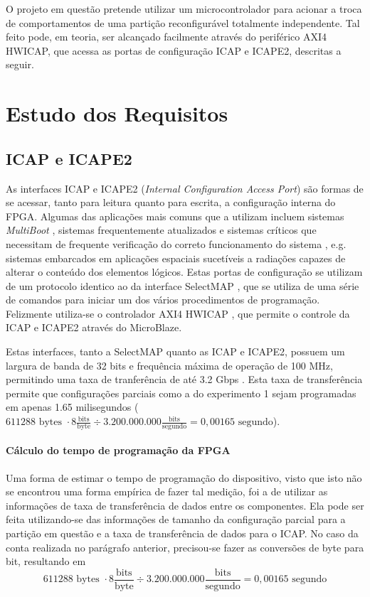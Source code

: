 \documentclass[11pt,a4paper,oneside]{book}
\begin{document}
O projeto em questão pretende utilizar um microcontrolador para acionar a troca de comportamentos de uma partição reconfigurável totalmente independente.
Tal feito pode, em teoria, ser alcançado facilmente através do periférico AXI4 HWICAP, que acessa as portas de configuração ICAP e ICAPE2, descritas a seguir.

\section{Estudo dos Requisitos}
\subsection{ICAP e ICAPE2}
As interfaces ICAP e ICAPE2 (\textit{Internal Configuration Access Port}) são formas de se acessar, tanto para leitura quanto para escrita, a configuração interna do FPGA.
Algumas das aplicações mais comuns que a utilizam incluem sistemas \textit{MultiBoot} \cite{xapp468, xapp1100}, sistemas frequentemente atualizados e sistemas críticos que necessitam de frequente verificação do correto funcionamento do sistema \cite{xapp468, xapp887}, e.g. sistemas embarcados em aplicações espaciais sucetíveis a radiações capazes de alterar o conteúdo dos elementos lógicos. 
Estas portas de configuração se utilizam de um protocolo identico ao da interface SelectMAP \cite{wp374, ug702}, que se utiliza de uma série de comandos para iniciar um dos vários procedimentos de programação.
Felizmente utiliza-se o controlador AXI4 HWICAP \cite{ds817}, que permite o controle da ICAP e ICAPE2 através do MicroBlaze.

Estas interfaces, tanto a SelectMAP quanto as ICAP e ICAPE2, possuem um largura de banda de 32 bits e frequência máxima de operação de 100 MHz, permitindo uma taxa de tranferência de até 3.2 Gbps \cite{ug702}.
Esta taxa de transferência permite que configurações parciais como a do experimento 1 sejam programadas em apenas 1.65 milisegundos ($611288\text{ bytes }\cdot8\frac{\text{bits}}{\text{byte}}\div3.200.000.000\frac{\text{bits}}{\text{segundo}} = 0,00165 \text{ segundo}$).

\paragraph{Cálculo do tempo de programação da FPGA}
Uma forma de estimar o tempo de programação do dispositivo, visto que isto não se encontrou uma forma empírica de fazer tal medição, foi a de utilizar as informações de taxa de transferência de dados entre os componentes.
Ela pode ser feita utilizando-se das informações de tamanho da configuração parcial para a partição em questão e a taxa de transferência de dados para o ICAP.
No caso da conta realizada no parágrafo anterior, precisou-se fazer as conversões de byte para bit, resultando em 
$$611288\text{ bytes }\cdot8\frac{\text{bits}}{\text{byte}}\div3.200.000.000\frac{\text{bits}}{\text{segundo}} = 0,00165 \text{ segundo}$$
\end{document}
